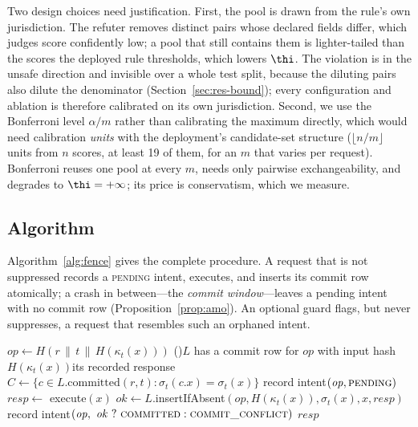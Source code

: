 Two design choices need justification. First, the pool is drawn from the rule's own jurisdiction. The refuter removes distinct pairs whose declared fields differ, which judges score confidently low; a pool that still contains them is lighter-tailed than the scores the deployed rule thresholds, which lowers $\thi$. The violation is in the unsafe direction and invisible over a whole test split, because the diluting pairs also dilute the denominator (Section~\ref{sec:res-bound}); every configuration and ablation is therefore calibrated on its own jurisdiction. Second, we use the Bonferroni level $\alpha/m$ rather than calibrating the maximum directly, which would need calibration \emph{units} with the deployment's candidate-set structure ($\lfloor n/m\rfloor$ units from $n$ scores, at least 19 of them, for an $m$ that varies per request). Bonferroni reuses one pool at every $m$, needs only pairwise exchangeability, and degrades to $\thi=+\infty$; its price is conservatism, which we measure.

\subsection{Algorithm}

Algorithm~\ref{alg:fence} gives the complete procedure. A request that is not suppressed records a \textsc{pending} intent, executes, and inserts its commit row atomically; a crash in between---the \emph{commit window}---leaves a pending intent with no commit row (Proposition~\ref{prop:amo}). An optional guard flags, but never suppresses, a request that resembles such an orphaned intent.

\begin{algorithm}[!tbp]
\caption{Layered semantic fence (the proposed configuration).}\label{alg:fence}
\scriptsize
{}
$\mathit{op}\gets H(r\,\|\,t\,\|\,H(\kappa_t(x)))$\;
\If(){$L$ has a commit row for $\mathit{op}$ with input hash $H(\kappa_t(x))$}{\Return its recorded response}
$C\gets\{c\in L.\mathrm{committed}(r,t) : \sigma_t(c.x)=\sigma_t(x)\}$
record intent$(\mathit{op},\textsc{pending})$\;
$\mathit{resp}\gets$ execute$(x)$ 
$\mathit{ok}\gets L.$insertIfAbsent$(\mathit{op},H(\kappa_t(x)),\sigma_t(x),x,\mathit{resp})$ 
record intent$(\mathit{op},\ \mathit{ok}\ ?\ \textsc{committed} : \textsc{commit\_conflict})$\;
\Return $\mathit{resp}$\;
\end{algorithm}

